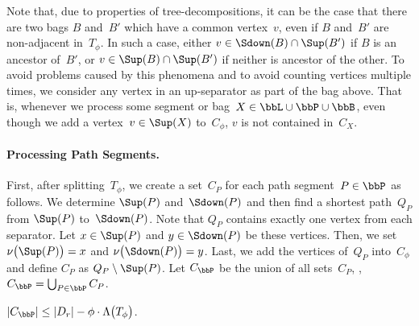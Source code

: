 Note that, due to properties of tree-decompositions, it can be the case that there are two bags $B$ and~$B'$ which have a common vertex~$v$, even if $B$ and~$B'$ are non-adjacent in~$T_\phi$.
In such a case, either $v \in \Sdown(B) \cap \Sup(B')$ if $B$ is an ancestor of~$B'$, or $v \in \Sup(B) \cap \Sup(B')$ if neither is ancestor of the other.
To avoid problems caused by this phenomena and to avoid counting vertices multiple times, we consider any vertex in an up-separator as part of the bag above.
That is, whenever we process some segment or bag~$X \in \bbL \cup \bbP \cup \bbB$, even though we add a vertex~$v \in \Sup(X)$ to~$C_\phi$, $v$ is not contained in~$C_X$.


\paragraph{Processing Path Segments.}
First, after splitting~$T_\phi$, we create a set~$C_{P}$ for each path segment~$P \in \bbP$ as follows.
We determine $\Sup(P)$ and~$\Sdown(P)$ and then find a shortest path~$Q_P$ from $\Sup(P)$ to~$\Sdown(P)$.
Note that $Q_P$ contains exactly one vertex from each separator.
Let $x \in \Sup(P)$ and $y \in \Sdown(P)$ be these vertices.
Then, we set $\nu \big( \Sup(P) \big) = x$ and $\nu \big( \Sdown(P) \big) = y$.
Last, we add the vertices of~$Q_P$ into~$C_\phi$ and define $C_P$ as $Q_P \setminus \Sup(P)$.
Let $C_\bbP$ be the union of all sets~$C_P$, \ie, $C_\bbP = \bigcup_{P \in \bbP} C_P$.

\begin{lemma}
    \label{lem:CPcardinality}
\( |C_\bbP| \leq |D_r| - \phi \cdot \Lambda \big( T_\phi \big) \).
\end{lemma}


